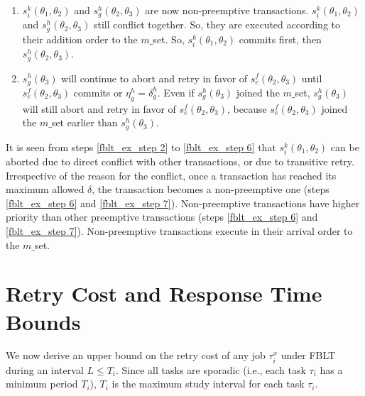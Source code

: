 \documentclass[prodmode,acmtecs]{acmsmall}
\begin{document}
\begin{enumerate}
%
\item $s_{i}^{k}(\theta_{1},\theta_{2})$ and $s_{g}^{h}(\theta_{2},\theta_{3})$
are now non-preemptive transactions. $s_{i}^{k}(\theta_{1},\theta_{2})$
and $s_{g}^{h}(\theta_{2},\theta_{3})$ still conflict together. So,
they are executed according to their addition order to the $m\_$set.
So, $s_{i}^{k}(\theta_{1},\theta_{2})$ commits first, then $s_{g}^{h}(\theta_{2},\theta_{3})$.
\item $s_{g}^{h}(\theta_{3})$ will continue to abort and retry in favor
of $s_{e}^{f}(\theta_{2},\theta_{3})$ until $s_{e}^{f}(\theta_{2},\theta_{3})$
commits or $\eta_{g}^{h}=\delta_{g}^{h}$. Even if $s_{g}^{h}(\theta_{3})$
joined the $m\_$set, $s_{g}^{h}(\theta_{3})$ will still abort and retry
in favor of $s_{e}^{f}(\theta_{2},\theta_{3})$, because $s_{e}^{f}(\theta_{2},\theta_{3})$ joined the $m\_$set earlier than $s_{g}^{h}(\theta_{3})$.
\end{enumerate}

It is seen from steps \ref{fblt_ex_step 2} to \ref{fblt_ex_step 6}
that $s_{i}^{k}(\theta_{1},\theta_{2})$ can be aborted due to direct
conflict with other transactions, or due to transitive retry. Irrespective of 
the reason for the conflict, once a transaction has reached its maximum
allowed $\delta$, the transaction becomes a non-preemptive one
(steps \ref{fblt_ex_step 6} and \ref{fblt_ex_step 7}). Non-preemptive
transactions have higher priority than other preemptive transactions
(steps \ref{fblt_ex_step 6} and \ref{fblt_ex_step 7}). Non-preemptive
transactions execute in their arrival order to the $m\_$set.


\section{Retry Cost and Response Time Bounds}\label{fblt rc}

We now derive an upper bound on the retry cost of any job $\tau_{i}^{x}$
under FBLT during an interval $L\le T_{i}$. Since all tasks are sporadic
(i.e., each task $\tau_{i}$ has a minimum period $T_{i}$), $T_{i}$
is the maximum study interval for each task $\tau_{i}$.
\end{document}
